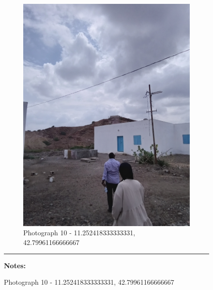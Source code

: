 \documentclass[12pt, letterpaper]{article}
\begin{document}
\begin{figure}[h]
{{                \begin{subfigure}{\linewidth}
                    \centering
                    \includegraphics[width=0.37\textheight, angle=-90]{photos/7.png}
                    \captionsetup{width=0.8\linewidth}
                    \caption{Photograph 10 - 11.252418333333331, 42.79961166666667}
                \end{subfigure}

                    \vspace{\baselineskip}

                    \hrule
                    \begin{minipage}[c][3.5cm][t]{0.4\textwidth} %
                            \begin{minipage}[t][1.5cm][t]{0.4\textwidth} %
                            \vspace{2mm}
                            \hspace{2mm}
                                \raggedright
                                \textbf{\small{Notes:} \footnotesize{}}


\end{minipage}
\end{minipage}}}
\end{figure}
\end{document}
